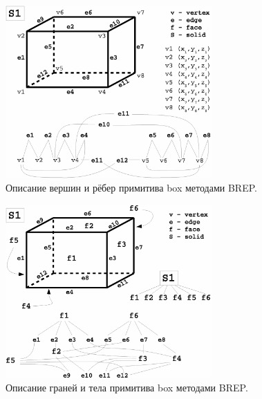 \begin{figure}[H]
\centering
\includegraphics[width=0.7\textwidth]{pictures/BREPbox1.eps}
\caption{Описание вершин и рёбер примитива box методами BREP.}
\label{fig:BREPbox1}
\end{figure}

\begin{figure}[H]
\centering
\includegraphics[width=0.7\textwidth]{pictures/BREPbox2.eps}
\caption{Описание граней и тела примитива box методами BREP.}
\label{fig:BREPbox2}
\end{figure}



